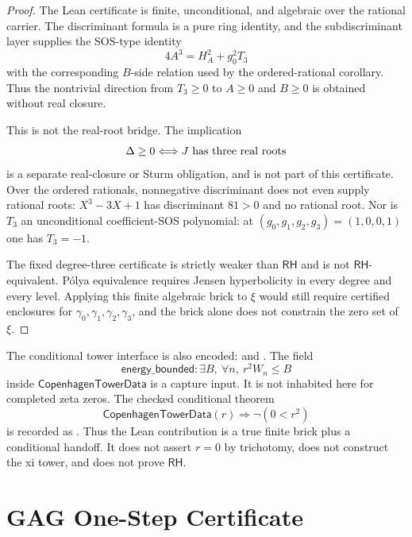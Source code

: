 \begin{proof}
The Lean certificate is finite, unconditional, and algebraic over the
rational carrier.  The discriminant formula is a pure ring identity, and
the subdiscriminant layer supplies the SOS-type identity
$$
4A^3=H_A^2+g_0^2T_3
$$
with the corresponding $B$-side relation used by the ordered-rational
corollary.  Thus the nontrivial direction from $T_3\ge0$ to $A\ge0$ and
$B\ge0$ is obtained without real closure.

This is not the real-root bridge.  The implication
$$
\Delta\ge0\Longleftrightarrow J \hbox{ has three real roots}
$$
is a separate real-closure or Sturm obligation, and is not part of this
certificate.  Over the ordered rationals, nonnegative discriminant does
not even supply rational roots: $X^3-3X+1$ has discriminant $81>0$ and no
rational root.  Nor is $T_3$ an unconditional coefficient-SOS polynomial:
at $(g_0,g_1,g_2,g_3)=(1,0,0,1)$ one has $T_3=-1$.

The fixed degree-three certificate is strictly weaker than
$\mathsf{RH}$ and is not $\mathsf{RH}$-equivalent.  P\'olya equivalence
requires Jensen hyperbolicity in every degree and every level.  Applying
this finite algebraic brick to $\xi$ would still require certified
enclosures for $\gamma_0,\gamma_1,\gamma_2,\gamma_3$, and the brick alone
does not constrain the zero set of $\xi$.
\end{proof}

The conditional tower interface is also encoded:
and
.
The field
$$
\mathsf{energy\_bounded}:
\exists B,\ \forall n,\ r^2W_n\le B
$$
inside $\mathsf{CopenhagenTowerData}$ is a capture input.  It is not
inhabited here for completed zeta zeros.  The checked conditional theorem
$$
\mathsf{CopenhagenTowerData}(r)
\Longrightarrow
\neg(0<r^2)
$$
is recorded as
.
Thus the Lean contribution is a true finite brick plus a conditional
handoff.  It does not assert $r=0$ by trichotomy, does not construct the
xi tower, and does not prove $\mathsf{RH}$.

\section{GAG One-Step Certificate}
\label{sec:rh-copenhagen-gag-one-step-certificate}

